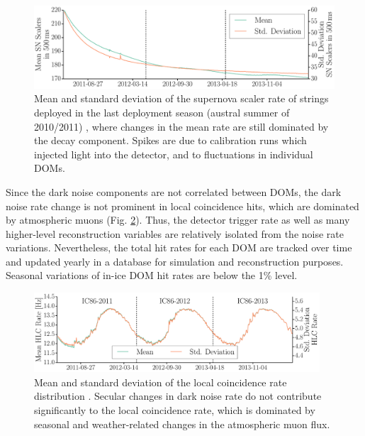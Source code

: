 \begin{figure}[!h]
 \centering
 \includegraphics[width=1.0\textwidth]{graphics/dom/performance/darknoise/SN_Scalers_IC86_mean_variance_Histo_IC86_2011_2012_2013_geomapping.pdf}
 \caption{Mean and standard deviation of the supernova scaler rate of strings
   deployed in the last deployment season (austral summer of 2010/2011)
   \cite{briedel_phd}, where changes in the mean rate are
still dominated by the decay component. Spikes are due to calibration
 runs which injected light into the detector, and to fluctuations in
 individual DOMs.} 
 \label{fig:noise_over_time_briedel_lastseasondepoyed}
\end{figure}

Since the dark noise components are not correlated between
DOMs, the dark noise rate change is not prominent in local coincidence
hits, which are dominated by atmospheric muons (Fig.
\ref{fig:hlc_over_time_briedel}).  Thus, the detector trigger rate as well
as many higher-level reconstruction variables are relatively isolated from the
noise rate variations.  Nevertheless, the total hit rates for each DOM are
tracked over time and updated yearly in a database for simulation and
reconstruction purposes.  Seasonal variations of in-ice DOM hit rates are
below the 1\% level.

\begin{figure}[!h]
 \centering
 \includegraphics[width=0.95\textwidth]{graphics/dom/performance/darknoise/HLC_Whole_Detector_Mean_Variance_IC86_2011_2012_2013.pdf}
 \caption{Mean and standard deviation of the local coincidence rate distribution
   \cite{briedel_phd}.  Secular changes in dark noise rate do not
   contribute significantly to the local coincidence rate,
  which is dominated by seasonal and weather-related
   changes in the atmospheric muon flux.} 
 \label{fig:hlc_over_time_briedel}
\end{figure}



